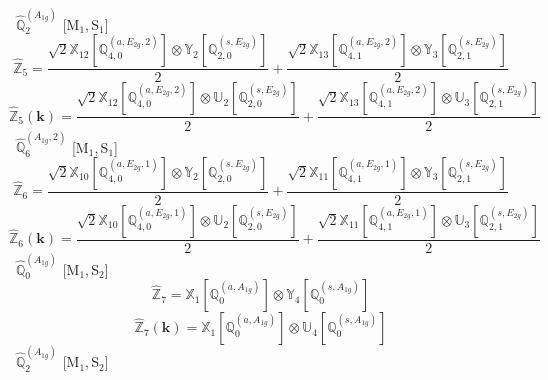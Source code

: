 \documentclass[fleqn,10pt,landscape]{article}
\begin{document}
\begin{itemize}
\begin{dmath*}
\end{dmath*}
\vspace{4mm}
\noindent {} $\,\,\,\hat{\mathbb{Q}}_{2}^{(A_{1g})}$ [M$_{1}$,\,S$_{1}$]
\begin{dmath*}
\hat{\mathbb{Z}}_{5}=\frac{\sqrt{2} \mathbb{X}_{12}[\mathbb{Q}_{4,0}^{(a,E_{2g},2)}] \otimes\mathbb{Y}_{2}[\mathbb{Q}_{2,0}^{(s,E_{2g})}]}{2} + \frac{\sqrt{2} \mathbb{X}_{13}[\mathbb{Q}_{4,1}^{(a,E_{2g},2)}] \otimes\mathbb{Y}_{3}[\mathbb{Q}_{2,1}^{(s,E_{2g})}]}{2}
\end{dmath*}
\begin{dmath*}
\hat{\mathbb{Z}}_{5}(\bm{k})=\frac{\sqrt{2} \mathbb{X}_{12}[\mathbb{Q}_{4,0}^{(a,E_{2g},2)}] \otimes\mathbb{U}_{2}[\mathbb{Q}_{2,0}^{(s,E_{2g})}]}{2} + \frac{\sqrt{2} \mathbb{X}_{13}[\mathbb{Q}_{4,1}^{(a,E_{2g},2)}] \otimes\mathbb{U}_{3}[\mathbb{Q}_{2,1}^{(s,E_{2g})}]}{2}
\end{dmath*}
\vspace{4mm}
\noindent {} $\,\,\,\hat{\mathbb{Q}}_{6}^{(A_{1g},2)}$ [M$_{1}$,\,S$_{1}$]
\begin{dmath*}
\hat{\mathbb{Z}}_{6}=\frac{\sqrt{2} \mathbb{X}_{10}[\mathbb{Q}_{4,0}^{(a,E_{2g},1)}] \otimes\mathbb{Y}_{2}[\mathbb{Q}_{2,0}^{(s,E_{2g})}]}{2} + \frac{\sqrt{2} \mathbb{X}_{11}[\mathbb{Q}_{4,1}^{(a,E_{2g},1)}] \otimes\mathbb{Y}_{3}[\mathbb{Q}_{2,1}^{(s,E_{2g})}]}{2}
\end{dmath*}
\begin{dmath*}
\hat{\mathbb{Z}}_{6}(\bm{k})=\frac{\sqrt{2} \mathbb{X}_{10}[\mathbb{Q}_{4,0}^{(a,E_{2g},1)}] \otimes\mathbb{U}_{2}[\mathbb{Q}_{2,0}^{(s,E_{2g})}]}{2} + \frac{\sqrt{2} \mathbb{X}_{11}[\mathbb{Q}_{4,1}^{(a,E_{2g},1)}] \otimes\mathbb{U}_{3}[\mathbb{Q}_{2,1}^{(s,E_{2g})}]}{2}
\end{dmath*}
\vspace{4mm}
\noindent {} $\,\,\,\hat{\mathbb{Q}}_{0}^{(A_{1g})}$ [M$_{1}$,\,S$_{2}$]
\begin{dmath*}
\hat{\mathbb{Z}}_{7}=\mathbb{X}_{1}[\mathbb{Q}_{0}^{(a,A_{1g})}] \otimes\mathbb{Y}_{4}[\mathbb{Q}_{0}^{(s,A_{1g})}]
\end{dmath*}
\begin{dmath*}
\hat{\mathbb{Z}}_{7}(\bm{k})=\mathbb{X}_{1}[\mathbb{Q}_{0}^{(a,A_{1g})}] \otimes\mathbb{U}_{4}[\mathbb{Q}_{0}^{(s,A_{1g})}]
\end{dmath*}
\vspace{4mm}
\noindent {} $\,\,\,\hat{\mathbb{Q}}_{2}^{(A_{1g})}$ [M$_{1}$,\,S$_{2}$]
\begin{dmath*}

\end{dmath*}
\end{itemize}
\end{document}
